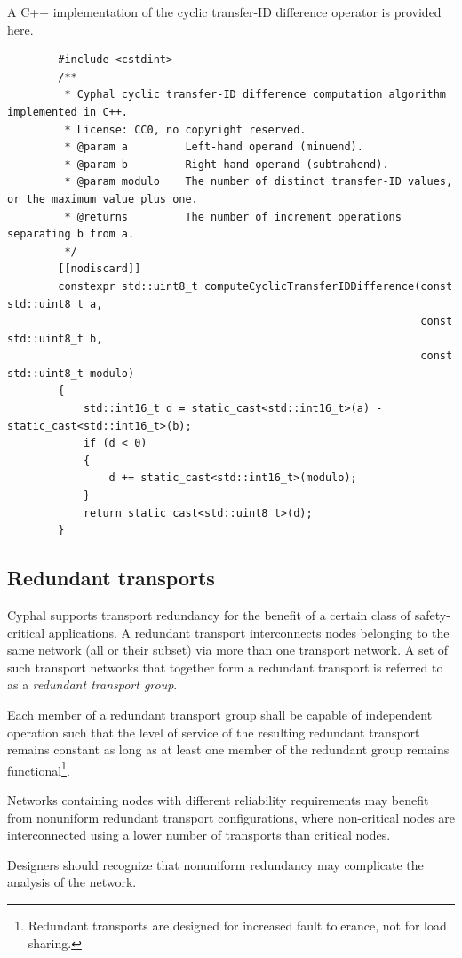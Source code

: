 \begin{remark}
    A C++ implementation of the cyclic transfer-ID difference operator is provided here.
    \begin{verbatim}
        #include <cstdint>
        /**
         * Cyphal cyclic transfer-ID difference computation algorithm implemented in C++.
         * License: CC0, no copyright reserved.
         * @param a         Left-hand operand (minuend).
         * @param b         Right-hand operand (subtrahend).
         * @param modulo    The number of distinct transfer-ID values, or the maximum value plus one.
         * @returns         The number of increment operations separating b from a.
         */
        [[nodiscard]]
        constexpr std::uint8_t computeCyclicTransferIDDifference(const std::uint8_t a,
                                                                 const std::uint8_t b,
                                                                 const std::uint8_t modulo)
        {
            std::int16_t d = static_cast<std::int16_t>(a) - static_cast<std::int16_t>(b);
            if (d < 0)
            {
                d += static_cast<std::int16_t>(modulo);
            }
            return static_cast<std::uint8_t>(d);
        }
    \end{verbatim}
\end{remark}

\subsection{Redundant transports}

Cyphal supports transport redundancy for the benefit of a certain class of safety-critical applications.
A redundant transport interconnects nodes belonging to the same network (all or their subset)
via more than one transport network.
A set of such transport networks that together form a redundant transport is referred to as a
\emph{redundant transport group}.

Each member of a redundant transport group shall be capable of independent operation
such that the level of service of the resulting redundant transport remains constant
as long as at least one member of the redundant group remains functional\footnote{%
    Redundant transports are designed for increased fault tolerance, not for load sharing.
}.

\begin{remark}
    Networks containing nodes with different reliability requirements may benefit from
    nonuniform redundant transport configurations, where non-critical nodes are interconnected
    using a lower number of transports than critical nodes.

    Designers should recognize that nonuniform redundancy may complicate the analysis of the network.
\end{remark}

